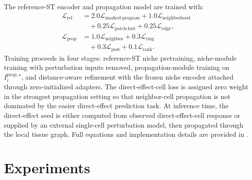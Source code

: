 \documentclass[sigconf,review,balance=false]{acmart}
\begin{document}
The reference-ST encoder and propagation model are trained with:
\begin{equation}
\label{eq:training_objectives}
\begin{aligned}
\mathcal{L}_{\mathrm{ref}}
&= 2.0\mathcal{L}_{\mathrm{masked\text{-}program}}
 + 1.0\mathcal{L}_{\mathrm{neighborhood}}\\
&\quad
 + 0.25\mathcal{L}_{\mathrm{patch\text{-}hist}}
 + 0.25\mathcal{L}_{\mathrm{edge}},\\
\mathcal{L}_{\mathrm{prop}}
&= 1.0\mathcal{L}_{\mathrm{neighbor}}
 + 0.3\mathcal{L}_{\mathrm{ring}}\\
&\quad
 + 0.3\mathcal{L}_{\mathrm{post}}
 + 0.1\mathcal{L}_{\mathrm{rank}} .
\end{aligned}
\end{equation}
Training proceeds in four stages: reference-ST niche pretraining, niche-module training with perturbation inputs removed, propagation-module training on $I_i^{\mathrm{prop},\star}$, and distance-aware refinement with the frozen niche encoder attached through zero-initialized adapters. The direct-effect-cell loss is assigned zero weight in the strongest propagation setting so that neighbor-cell propagation is not dominated by the easier direct-effect prediction task. At inference time, the direct-effect seed is either computed from observed direct-effect-cell response or supplied by an external single-cell perturbation model, then propagated through the local tissue graph. Full equations and implementation details are provided in .

\section{Experiments}
\label{sec:experiments}
\end{document}
